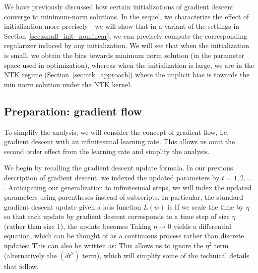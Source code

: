 

We have previously discussed how certain initializations of gradient descent converge to minimum-norm solutions. In the sequel, we characterize the effect of initialization more precisely---we will show that in a variant of the settings in Section~\ref{sec:small_init_nonlinear}, we can precisely compute the corresponding regularizer induced by any initialization. We will see that when the initialization is small, we obtain the bias towards minimum norm solution (in the parameter space used in optimization), whereas when the initialization is large, we are in the NTK regime (Section~\ref{sec:ntk_approach}) where the implicit bias is towards the min norm solution under the NTK kernel. 

\subsection{Preparation: gradient flow}
To simplify the analysis, we will consider the concept of gradient flow, i.e. gradient descent with an infinitesimal learning rate.  This allows us omit the second order effect from the learning rate and simplify the analysis. 

We begin by recalling the gradient descent update formula. In our previous description of gradient descent, we indexed the updated parameters by $t = 1,2,\dots$. Anticipating our generalization to infinitesimal steps, we will index the updated parameters using parentheses instead of subscripts. In particular, the standard gradient descent update given a loss function $L(w)$ is
If we scale the time by $\eta$ so that each update by gradient descent corresponds to a time step of size $\eta$ (rather than size 1), the update becomes
Taking $\eta \to 0$ yields a differential equation, which can be thought of as a continuous process rather than discrete updates:
This can also be written as:
This allows us to ignore the $\eta^2$ term (alternatively the $(dt^2)$ term), which will simplify some of the technical details that follow.


